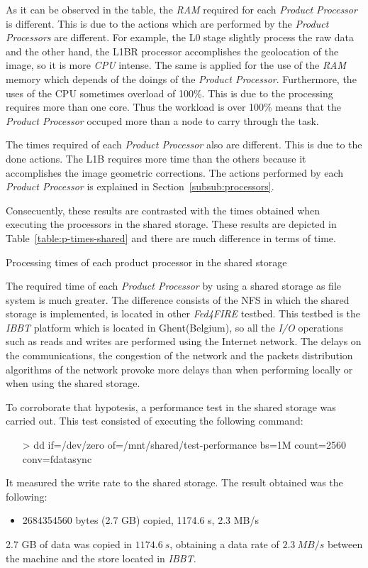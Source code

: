 As it can be observed in the table, the \emph{RAM} required for each
\emph{Product Processor} is different. This is due to the actions which are
performed by the \emph{Product Processors} are different. For example, the L0
stage slightly process the raw data and the other hand, the L1BR processor
accomplishes the geolocation of the image, so it is more \emph{CPU} intense. 
The same is applied for the use of the \emph{RAM} memory which depends of the
doings of the \emph{Product Processor}.
Furthermore, the
uses of the \ac{CPU} sometimes overload of 100\%. This is due to the processing
requires more than one core. Thus the workload is over 100\% means that the
\emph{Product Processor} occuped more than a node to carry through the task.

The times required of each \emph{Product Processor} also are different. This is
due to the done actions. The L1B requires more time than the others because it accomplishes the image
geometric corrections. The actions performed by each \emph{Product Processor} is
explained in Section~\ref{subsub:processors}. 



Consecuently, these results are contrasted with the times obtained when executing
the processors in the shared storage. These results are depicted in Table~\ref{table:p-times-shared}
and there are much difference in terms of time.

\begin{table}[!h]
  \centering
  {\small
  
  }
  \caption{Processing times of each product processor in the shared storage}
  \label{table:p-times-shared}
\end{table}

The required time of each \emph{Product Processor} by using a shared storage as
file system is much greater. The difference consists of the \ac{NFS} in which
the shared storage is implemented,  is located
in other \emph{Fed4FIRE} testbed. This testbed is the \emph{IBBT} platform which is located in
Ghent(Belgium), so all the \emph{I/O} operations such as reads and writes are performed
using the Internet network. The delays on the communications, the congestion of
the network and the packets distribution algorithms of the network provoke more
delays than when performing locally or when using the shared storage.  

To corroborate that hypotesis, a performance test in the shared storage was carried out. This test
consisted of executing the following command:
\begin{itemize}
\item[>] dd if=/dev/zero of=/mnt/shared/test-performance bs=1M count=2560
  conv=fdatasync
\end{itemize}
It measured the write rate to the shared storage. The result obtained was the
following:
\begin{itemize}
\item 2684354560 bytes (2.7 GB) copied, 1174.6 s, 2.3 MB/s
\end{itemize}
2.7 GB of data was copied in $1174.6~s$, obtaining a data rate  of $2.3~MB/s$ between the
\bonfire machine and the store located in \emph{IBBT}. 

